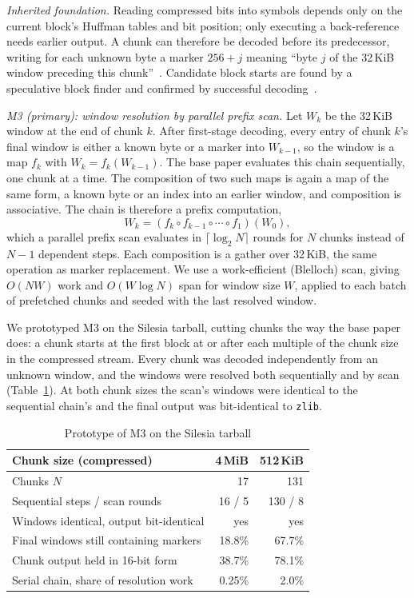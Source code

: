 \documentclass[conference]{IEEEtran}
\begin{document}
\emph{Inherited foundation.} Reading compressed bits into symbols depends only on
the current block's Huffman tables and bit position; only executing a
back-reference needs earlier output. A chunk can therefore be decoded before its
predecessor, writing for each unknown byte a marker $256 + j$ meaning ``byte $j$
of the 32\,KiB window preceding this chunk''~\cite{pugz}. Candidate block starts
are found by a speculative block finder and confirmed by successful
decoding~\cite{rapidgzip}.

\emph{M3 (primary): window resolution by parallel prefix scan.} Let $W_k$ be the
32\,KiB window at the end of chunk $k$. After first-stage decoding, every entry of
chunk $k$'s final window is either a known byte or a marker into $W_{k-1}$, so the
window is a map $f_k$ with $W_k = f_k(W_{k-1})$. The base paper evaluates this
chain sequentially, one chunk at a time. The composition of two such maps is
again a map of the same form, a known byte or an index into an earlier window,
and composition is associative. The chain is therefore a prefix computation,
\[
W_k = (f_k \circ f_{k-1} \circ \cdots \circ f_1)(W_0),
\]
which a parallel prefix scan evaluates in $\lceil \log_2 N \rceil$ rounds for $N$
chunks instead of $N-1$ dependent steps. Each composition is a gather over
32\,KiB, the same operation as marker replacement. We use a work-efficient
(Blelloch) scan, giving $O(NW)$ work and $O(W \log N)$ span for window size $W$,
applied to each batch of prefetched chunks and seeded with the last resolved
window.

We prototyped M3 on the Silesia tarball, cutting chunks the way the base paper
does: a chunk starts at the first block at or after each multiple of the chunk
size in the compressed stream. Every chunk was decoded independently from an
unknown window, and the windows were resolved both sequentially and by scan
(Table~\ref{tab:scan}). At both chunk sizes the scan's windows were identical to
the sequential chain's and the final output was bit-identical to \texttt{zlib}.

\begin{table}[t]
\caption{Prototype of M3 on the Silesia tarball}
\label{tab:scan}
\centering
\footnotesize
\setlength{\tabcolsep}{4pt}
\begin{tabular}{@{}lrr@{}}
\toprule
\textbf{Chunk size (compressed)} & \textbf{4\,MiB} & \textbf{512\,KiB} \\
\midrule
Chunks $N$ & 17 & 131 \\
Sequential steps / scan rounds & 16 / 5 & 130 / 8 \\
Windows identical, output bit-identical & yes & yes \\
Final windows still containing markers & 18.8\% & 67.7\% \\
Chunk output held in 16-bit form & 38.7\% & 78.1\% \\
Serial chain, share of resolution work & 0.25\% & 2.0\% \\
\bottomrule
\end{tabular}
\end{table}
\end{document}
